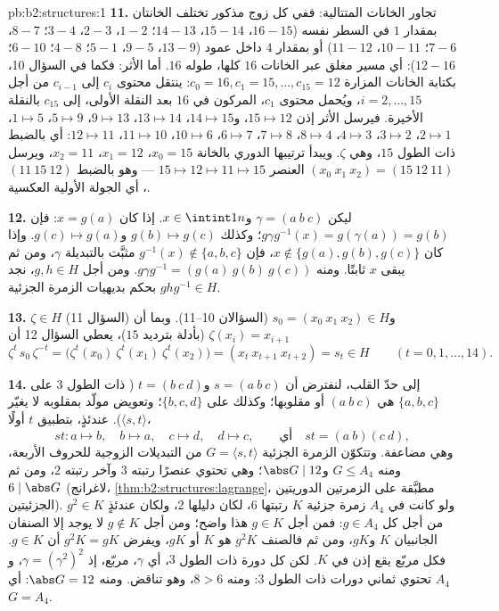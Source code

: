 \begin{solution}{pb:b2:structures:1}
\textbf{11.} تجاور الخانات المتتالية: ففي كل زوج مذكور تختلف
الخانتان بمقدار $1$ في السطر نفسه ($16{-}15$،
$15{-}14$، $14{-}13$؛ $1{-}2$، $2{-}3$، $3{-}4$؛ $8{-}7$،
$7{-}6$؛ $10{-}11$، $11{-}12$) أو بمقدار $4$ داخل عمود
($13{-}9$، $9{-}5$، $5{-}1$؛ $4{-}8$؛ $6{-}10$؛ $12{-}16$): أي
مسير مغلق عبر الخانات $16$ كلها، طوله $16$. أما الأثر: فكما
في السؤال 10، بكتابة الخانات المزارة $c_0 = 16, c_1 = 15,
\dots, c_{15} = 12$: ينتقل محتوى $c_i$ إلى $c_{i-1}$ من أجل
$i = 2, \dots, 15$، ويُحمل محتوى $c_1$، المركون في $16$
بعد النقلة الأولى، إلى $c_{15}$ بالنقلة الأخيرة.
فيرسل الأثر إذن $15 \mapsto 12$، و$14 \mapsto 15$، $13
\mapsto 14$، $9 \mapsto 13$، $5 \mapsto 9$، $1 \mapsto 5$، $2
\mapsto 1$، $3 \mapsto 2$، $4 \mapsto 3$، $8 \mapsto 4$، $7
\mapsto 8$، $6 \mapsto 7$، $10 \mapsto 6$، $11 \mapsto 10$، $12
\mapsto 11$: أي بالضبط  ذات الطول $15$، وهي $\zeta$. ويبدأ ترتيبها الدوري
بالخانة $x_0 = 15$، $x_1 = 12$، $x_2 = 11$، ويرسل $(x_0\ x_1\ x_2)
= (15\ 12\ 11)$ العنصر $15 \mapsto 12 \mapsto 11 \mapsto 15$ ---
وهو بالضبط $(11\ 15\ 12)$، أي الجولة الأولية العكسية.

\textbf{12.} ليكن $\gamma = (a\ b\ c)$ و$x \in \intint1n$. إذا كان
$x = g(a)$: فإن $g\gamma g^{-1}(x) = g(\gamma(a)) = g(b)$؛ وكذلك
$g(b) \mapsto g(c)$ و$g(c) \mapsto g(a)$. وإذا كان $x \notin
\{g(a), g(b), g(c)\}$، فإن $g^{-1}(x) \notin \{a,b,c\}$
مثبَّت بالتبديلة $\gamma$، ومن ثم يبقى $x$ ثابتًا. ومنه $g\gamma g^{-1} =
(g(a)\ g(b)\ g(c))$. ومن أجل $g, h \in H$، نجد $ghg^{-1} \in H$ بحكم
بديهيات الزمرة الجزئية.

\textbf{13.} $\zeta \in H$ (السؤال 11) و$s_0 = (x_0\ x_1\
x_2) \in H$ (السؤالان 10--11). وبما أن $\zeta(x_i) = x_{i+1}$
(بأدلة بترديد $15$)، يعطي السؤال 12 أن
\[
\zeta^{t}\,s_0\,\zeta^{-t}
= \bigl(\zeta^t(x_0)\ \zeta^t(x_1)\ \zeta^t(x_2)\bigr)
= (x_t\ x_{t+1}\ x_{t+2}) = s_t \in H
\qquad (t = 0, 1, \dots, 14).
\]

\textbf{14.} إلى حدّ القلب، لنفترض أن $s = (a\ b\ c)$ و$t =
(b\ c\ d)$ ( ذات الطول $3$ على $\{a,b,c\}$ هي $(a\ b\ c)$ أو
مقلوبها؛ وكذلك على $\{b,c,d\}$؛ وتعويض مولّد بمقلوبه
لا يغيّر $\langle s, t\rangle$). عندئذٍ، بتطبيق
$t$ أولًا،
\[
st \colon a \mapsto b,\quad b \mapsto a,\quad c \mapsto d,\quad
d \mapsto c, \qquad\text{أي}\quad st = (a\ b)(c\ d),
\]
وهي  مضاعفة. وتتكوّن الزمرة الجزئية $G = \langle s, t\rangle$
من التبديلات الزوجية للحروف الأربعة، ومنه $G \leq
A_4$ و$\abs G \mid 12$؛ وهي تحتوي عنصرًا رتبته $3$
وآخر رتبته $2$، ومن ثم $6 \mid \abs G$ (لاغرانج،
\cref{thm:b2:structures:lagrange}، مطبَّقة على الزمرتين الدوريتين
الجزئيتين). ولو كانت في $A_4$ زمرة جزئية $K$ رتبتها $6$، لكان
دليلها $2$، ولكان عندئذٍ $g^2 \in K$ من أجل كل $g \in A_4$: فمن أجل
$g \in K$ هذا واضح؛ ومن أجل $g \notin K$ لا يوجد إلا الصنفان الجانبيان
$K$ و$gK$، ومن ثم فالصنف $g^2K$ هو $K$ أو $gK$، ويفرض $g^2K =
gK$ أن $g \in K$. فكل مربّع يقع إذن في $K$. لكن كل
دورة ذات الطول $3$، أي $\gamma$، مربّع، إذ $\gamma = (\gamma^2)^2$،
و$A_4$ تحتوي ثماني دورات ذات الطول $3$: ومنه $8 > 6$، وهو تناقض. ومنه
$\abs G = 12$: أي $G = A_4$.


\end{solution}
